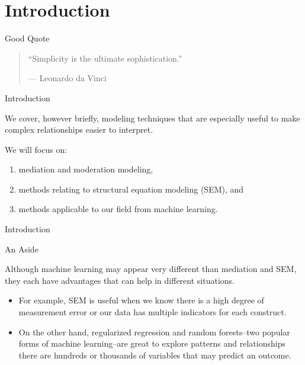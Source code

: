 \section{Introduction}\label{introduction}

\begin{frame}{Good Quote}

\large

\begin{quote}
``Simplicity is the ultimate sophistication.''

--- Leonardo da Vinci
\end{quote}

\end{frame}

\begin{frame}{Introduction}

We cover, however briefly, modeling techniques that are especially
useful to make complex relationships easier to interpret.

We will focus on:

\begin{enumerate}
\def\labelenumi{\arabic{enumi}.}
\tightlist
\item
  mediation and moderation modeling,
\item
  methods relating to structural equation modeling (SEM), and
\item
  methods applicable to our field from machine learning.
\end{enumerate}

\end{frame}

\begin{frame}{Introduction}

\begin{block}{An Aside}

Although machine learning may appear very different than mediation and
SEM, they each have advantages that can help in different situations.

\begin{itemize}
\tightlist
\item
  For example, SEM is useful when we know there is a high degree of
  measurement error or our data has multiple indicators for each
  construct.
\item
  On the other hand, regularized regression and random forests--two
  popular forms of machine learning--are great to explore patterns and
  relationships there are hundreds or thousands of variables that may
  predict an outcome.
\end{itemize}

\end{block}

\end{frame}

